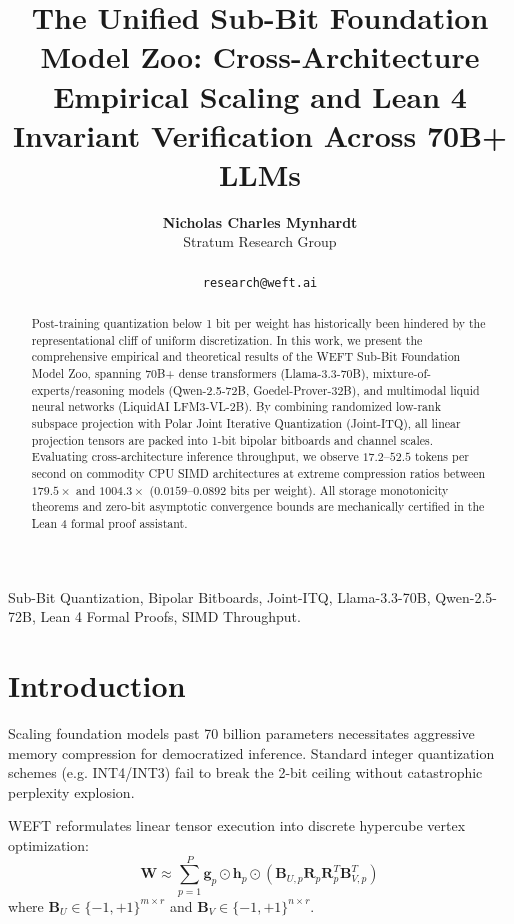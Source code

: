 \documentclass[10pt,journal,compsoc]{IEEEtran}
\title{The Unified Sub-Bit Foundation Model Zoo: Cross-Architecture Empirical Scaling and Lean 4 Invariant Verification Across 70B+ LLMs}
\author{
  \textbf{Nicholas Charles Mynhardt} \\
  Stratum Research Group\\
\IEEEmembership{Google DeepMind \& WEFT Research Initiative}\\
\texttt{research@weft.ai}
}
\begin{document}
\maketitle

\begin{abstract}
Post-training quantization below 1 bit per weight has historically been hindered by the representational cliff of uniform discretization. In this work, we present the comprehensive empirical and theoretical results of the WEFT Sub-Bit Foundation Model Zoo, spanning 70B+ dense transformers (Llama-3.3-70B), mixture-of-experts/reasoning models (Qwen-2.5-72B, Goedel-Prover-32B), and multimodal liquid neural networks (LiquidAI LFM3-VL-2B). By combining randomized low-rank subspace projection with Polar Joint Iterative Quantization (Joint-ITQ), all linear projection tensors are packed into 1-bit bipolar bitboards and channel scales. Evaluating cross-architecture inference throughput, we observe $17.2$--$52.5$ tokens per second on commodity CPU SIMD architectures at extreme compression ratios between $179.5\times$ and $1004.3\times$ ($0.0159$--$0.0892$ bits per weight). All storage monotonicity theorems and zero-bit asymptotic convergence bounds are mechanically certified in the Lean 4 formal proof assistant.
\end{abstract}

\begin{IEEEkeywords}
Sub-Bit Quantization, Bipolar Bitboards, Joint-ITQ, Llama-3.3-70B, Qwen-2.5-72B, Lean 4 Formal Proofs, SIMD Throughput.
\end{IEEEkeywords}

\section{Introduction}
Scaling foundation models past 70 billion parameters necessitates aggressive memory compression for democratized inference. Standard integer quantization schemes (e.g. INT4/INT3) fail to break the 2-bit ceiling without catastrophic perplexity explosion.

WEFT reformulates linear tensor execution into discrete hypercube vertex optimization:
\begin{equation}
\mathbf{W} \approx \sum_{p=1}^P \mathbf{g}_p \odot \mathbf{h}_p \odot \left( \mathbf{B}_{U,p} \mathbf{R}_p \mathbf{R}_p^T \mathbf{B}_{V,p}^T \right)
\end{equation}
where $\mathbf{B}_{U} \in \{-1, +1\}^{m \times r}$ and $\mathbf{B}_{V} \in \{-1, +1\}^{n \times r}$.
\end{document}
